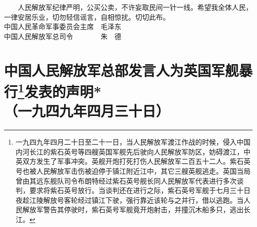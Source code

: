 \documentclass[cn,11pt,chinese]{elegantbook}
\def\myformat#1{\hfil\hfil #1}
\begin{document}
　　人民解放军纪律严明，公买公卖，不许妄取民间一针一线。希望我全体人民，一律安居乐业，切勿轻信谣言，自相惊扰。切切此布。\\
中国人民革命军事委员会主席　毛泽东\\
中国人民解放军总司令　　　　朱　德\\
\newpage\section*{\myformat{中国人民解放军总部发言人为英国军舰暴行\footnote[1]{ 一九四九年四月二十日至二十一日，当人民解放军渡江作战的时候，侵入中国内河长江的紫石英号等四艘英国军舰先后驶向人民解放军防区，妨碍渡江，中英双方发生了军事冲突。英舰开炮打死打伤人民解放军二百五十二人。紫石英号也被人民解放军击伤被迫停于镇江附近江中，其它三艘英舰逃走。英国当局曾由其远东舰队司令布朗特经过紫石英号舰长同人民解放军代表进行多次谈判，要求将紫石英号放行。当谈判还在进行之际，紫石英号军舰于七月三十日夜趁江陵解放号客轮经过镇江下驶，强行靠近该轮与之并行，借以逃跑。当人民解放军警告其停驶时，紫石英号军舰竟开炮射击，并撞沉木船多只，逃出长江。}发表的声明*}\\\myformat{（一九四九年四月三十日）}}
\end{document}
